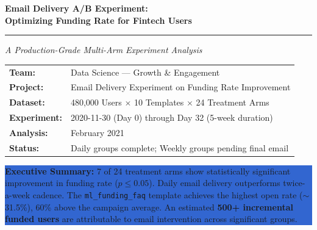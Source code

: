 \documentclass[12pt,a4paper]{article}
\begin{document}
\begin{titlepage}
  \centering
  \vspace*{1.5cm}

  {\LARGE\bfseries\color{navy}
    Email Delivery A/B Experiment: \\[0.4em]
    Optimizing Funding Rate for Fintech Users
  }

  \vspace{1cm}
  \rule{\linewidth}{1.5pt}
  \vspace{0.5cm}

  {\large\textit{A Production-Grade Multi-Arm Experiment Analysis}}

  \vspace{1.5cm}

  \begin{tabular}{ll}
    \textbf{Team:}        & Data Science — Growth \& Engagement \\
    \textbf{Project:}     & Email Delivery Experiment on Funding Rate Improvement \\
    \textbf{Dataset:}     & 480,000 Users $\times$ 10 Templates $\times$ 24 Treatment Arms \\
    \textbf{Experiment:}  & 2020-11-30 (Day 0) through Day 32 (5-week duration) \\
    \textbf{Analysis:}    & February 2021 \\
    \textbf{Status:}      & Daily groups complete; Weekly groups pending final email \\
  \end{tabular}

  \vspace{2cm}

  \colorbox{highlight}{%
    \parbox{0.85\textwidth}{%
      \centering
      \textbf{Executive Summary:} 7 of 24 treatment arms show statistically significant
      improvement in funding rate ($p \leq 0.05$). Daily email delivery outperforms
      twice-a-week cadence. The \texttt{ml\_funding\_faq} template achieves the highest
      open rate ($\sim$31.5\%), 60\% above the campaign average.
      An estimated \textbf{500+ incremental funded users} are attributable to email intervention
      across significant groups.
    }
  }

  \vfill

\end{titlepage}

\tableofcontents
\clearpage
\end{document}
